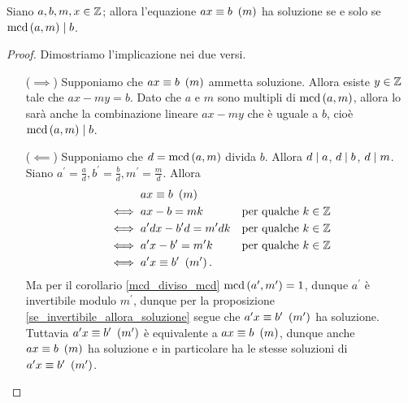 \begin{proposition} \label{cong_ha_soluzione_sse_mcd_div_b}
    Siano $a, b, m, x \in \mathbb{Z}$; allora l'equazione $ax \equiv b \ \left(m\right)$ ha soluzione se e solo se $\operatorname{mcd}\left(a, m\right) \mid b$.
\end{proposition}
\begin{proof}
    Dimostriamo l'implicazione nei due versi.
    \begin{itemize}
        \item[($\implies$)] Supponiamo che $ax \equiv b \ \left(m\right)$ ammetta soluzione. Allora esiste $y \in \mathbb{Z}$ tale che $ax - my = b$. Dato che $a$ e $m$ sono multipli di $\operatorname{mcd}\left(a, m\right)$, allora lo sarà anche la combinazione lineare $ax - my$ che è uguale a $b$, cioè $\operatorname{mcd}\left(a, m\right) \mid b$.
        \item[($\impliedby$)] Supponiamo che $d = \operatorname{mcd}\left(a, m\right)$ divida $b$. Allora $d\mid a$, $d \mid b$, $d \mid m$. Siano $a^\prime = \frac{a}{d}, b^\prime = \frac{b}{d}, m^\prime = \frac{m}{d}$. Allora 
        \begin{align*}
            &ax \equiv b \ \left(m\right)\\
            \iff{} &ax - b = mk   &\text{per qualche $k \in \mathbb{Z}$} \\
            \iff{} &a^\prime dx - b^\prime d = m^\prime dk &\text{per qualche $k \in \mathbb{Z}$} \\
            \iff{} &a^\prime x - b^\prime = m^\prime k &\text{per qualche $k \in \mathbb{Z}$} \\
            \iff{} &a^\prime x \equiv b^\prime \ \left(m^\prime \right).
        \end{align*}
        Ma per il corollario \ref{mcd_diviso_mcd} $\operatorname{mcd}\left(a^\prime, m^\prime\right) = 1$, dunque $a^\prime$ è invertibile modulo $m^\prime$, dunque per la proposizione \ref{se_invertibile_allora_soluzione} segue che $a^\prime x \equiv b^\prime \ \left(m^\prime\right)$ ha soluzione. Tuttavia $a^\prime x \equiv b^\prime \ \left(m^\prime\right)$ è equivalente a $ax \equiv b \ \left(m\right)$, dunque anche $ax \equiv b \ \left(m\right)$ ha soluzione e in particolare ha le stesse soluzioni di $a^\prime x \equiv b^\prime \ \left(m^\prime\right)$. \qedhere
    \end{itemize}
\end{proof}

